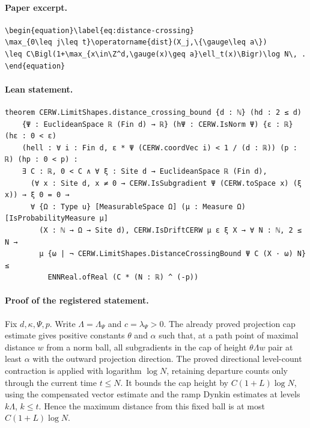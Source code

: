 \paragraph{Paper excerpt.}
\begin{verbatim}
\begin{equation}\label{eq:distance-crossing}
\max_{0\leq j\leq t}\operatorname{dist}(X_j,\{\gauge\leq a\})
\leq C\Bigl(1+\max_{x\in\Z^d,\gauge(x)\geq a}\ell_t(x)\Bigr)\log N\, .
\end{equation}
\end{verbatim}
\paragraph{Lean statement.}
\begin{verbatim}
theorem CERW.LimitShapes.distance_crossing_bound {d : ℕ} (hd : 2 ≤ d)
    {Ψ : EuclideanSpace ℝ (Fin d) → ℝ} (hΨ : CERW.IsNorm Ψ) {ε : ℝ} (hε : 0 < ε)
    (hell : ∀ i : Fin d, ε * Ψ (CERW.coordVec i) < 1 / (d : ℝ)) (p : ℝ) (hp : 0 < p) :
    ∃ C : ℝ, 0 < C ∧ ∀ ξ : Site d → EuclideanSpace ℝ (Fin d),
      (∀ x : Site d, x ≠ 0 → CERW.IsSubgradient Ψ (CERW.toSpace x) (ξ x)) → ξ 0 = 0 →
      ∀ {Ω : Type u} [MeasurableSpace Ω] (μ : Measure Ω) [IsProbabilityMeasure μ]
        (X : ℕ → Ω → Site d), CERW.IsDriftCERW μ ε ξ X → ∀ N : ℕ, 2 ≤ N →
        μ {ω | ¬ CERW.LimitShapes.DistanceCrossingBound Ψ C (X · ω) N} ≤
          ENNReal.ofReal (C * (N : ℝ) ^ (-p))
\end{verbatim}
\paragraph{Proof of the registered statement.}
Fix $d,\kappa,\Psi,p$. Write $\Lambda=\Lambda_\Psi$ and
$c=\lambda_\Psi>0$. The already proved projection cap estimate gives positive
constants $\theta$ and $\alpha$ such that, at a path point of maximal distance
$w$ from a norm ball, all subgradients in the cap of height $\theta\Lambda w$
pair at least $\alpha$ with the outward projection direction.
The proved directional level-count contraction is applied with logarithm
$\log N$, retaining departure counts only through the current time $t\leq N$.
It bounds the cap height by $C(1+L)\log N$, using the compensated vector
estimate and the ramp Dynkin estimates at levels $k\Lambda$, $k\leq t$.
Hence the maximum distance from this fixed ball is at most $C(1+L)\log N$.

